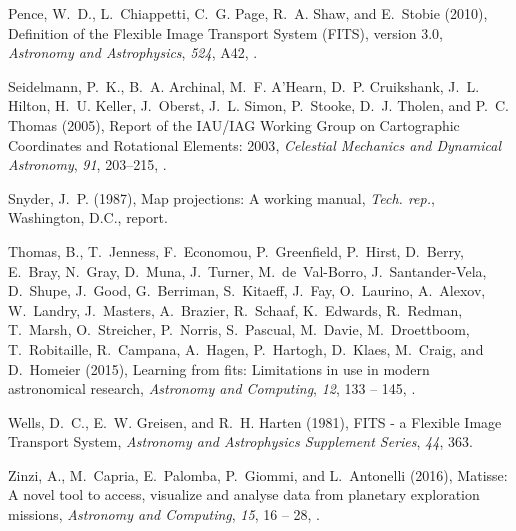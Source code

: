 \begin{thebibliography}{22}
{Pence}, W.~D., L.~{Chiappetti}, C.~G. {Page}, R.~A. {Shaw}, and E.~{Stobie}
  (2010), {Definition of the Flexible Image Transport System (FITS), version
  3.0}, \textit{Astronomy and Astrophysics}, \textit{524}, A42,
  .

{Seidelmann}, P.~K., B.~A. {Archinal}, M.~F. {A'Hearn}, D.~P. {Cruikshank},
  J.~L. {Hilton}, H.~U. {Keller}, J.~{Oberst}, J.~L. {Simon}, P.~{Stooke},
  D.~J. {Tholen}, and P.~C. {Thomas} (2005), {Report of the IAU/IAG Working
  Group on Cartographic Coordinates and Rotational Elements: 2003},
  \textit{Celestial Mechanics and Dynamical Astronomy}, \textit{91}, 203--215,
  .

Snyder, J.~P. (1987), Map projections: A working manual, \textit{Tech. rep.},
  Washington, D.C., report.

Thomas, B., T.~Jenness, F.~Economou, P.~Greenfield, P.~Hirst, D.~Berry,
  E.~Bray, N.~Gray, D.~Muna, J.~Turner, M.~de~Val-Borro, J.~Santander-Vela,
  D.~Shupe, J.~Good, G.~Berriman, S.~Kitaeff, J.~Fay, O.~Laurino, A.~Alexov,
  W.~Landry, J.~Masters, A.~Brazier, R.~Schaaf, K.~Edwards, R.~Redman,
  T.~Marsh, O.~Streicher, P.~Norris, S.~Pascual, M.~Davie, M.~Droettboom,
  T.~Robitaille, R.~Campana, A.~Hagen, P.~Hartogh, D.~Klaes, M.~Craig, and
  D.~Homeier (2015), Learning from fits: Limitations in use in modern
  astronomical research, \textit{Astronomy and Computing}, \textit{12}, 133 --
  145, .

{Wells}, D.~C., E.~W. {Greisen}, and R.~H. {Harten} (1981), {FITS - a Flexible
  Image Transport System}, \textit{Astronomy and Astrophysics Supplement
  Series}, \textit{44}, 363.

Zinzi, A., M.~Capria, E.~Palomba, P.~Giommi, and L.~Antonelli (2016), Matisse:
  A novel tool to access, visualize and analyse data from planetary exploration
  missions, \textit{Astronomy and Computing}, \textit{15}, 16 -- 28,
  .

\end{thebibliography}

